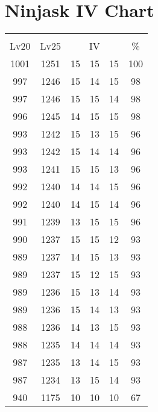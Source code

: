 \documentclass{article}%
\begin{document}
%
\normalsize%
\section{Ninjask IV Chart}%
\label{sec:Ninjask IV Chart}%
\renewcommand{\arraystretch}{1.5}%
\begin{tabular}{|c|c|c|c|c|c|}%
\hline%
\multicolumn{6}{|c|}{\textcolor{white}{ 
\linebreak{Ninjask}
}%
\cellcolor{black}}\\%
\multicolumn{1}{|c}{Lv20}&\multicolumn{1}{c|}{Lv25}&\multicolumn{3}{c|}{IV}&\multicolumn{1}{|c|}{\%}\\%
\hline%
\rowcolor{color100}%
1001&1251&15&15&15&100\\%
\hline%
\rowcolor{color98}%
997&1246&15&14&15&98\\%
\hline%
\rowcolor{color98}%
997&1246&15&15&14&98\\%
\hline%
\rowcolor{color98}%
996&1245&14&15&15&98\\%
\hline%
\rowcolor{color96}%
993&1242&15&13&15&96\\%
\hline%
\rowcolor{color96}%
993&1242&15&14&14&96\\%
\hline%
\rowcolor{color96}%
993&1241&15&15&13&96\\%
\hline%
\rowcolor{color96}%
992&1240&14&14&15&96\\%
\hline%
\rowcolor{color96}%
992&1240&14&15&14&96\\%
\hline%
\rowcolor{color96}%
991&1239&13&15&15&96\\%
\hline%
\rowcolor{color93}%
990&1237&15&15&12&93\\%
\hline%
\rowcolor{color93}%
989&1237&14&15&13&93\\%
\hline%
\rowcolor{color93}%
989&1237&15&12&15&93\\%
\hline%
\rowcolor{color93}%
989&1236&15&13&14&93\\%
\hline%
\rowcolor{color93}%
989&1236&15&14&13&93\\%
\hline%
\rowcolor{color93}%
988&1236&14&13&15&93\\%
\hline%
\rowcolor{color93}%
988&1235&14&14&14&93\\%
\hline%
\rowcolor{color93}%
987&1235&13&14&15&93\\%
\hline%
\rowcolor{color93}%
987&1234&13&15&14&93\\%
\hline%
\rowcolor{color91}%
940&1175&10&10&10&67\\%
\end{tabular}

%
\end{document}
